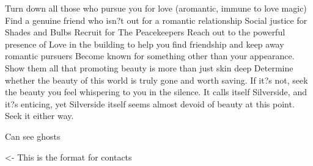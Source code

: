 \documentclass[char]{Silversiders}
\begin{document}
\name{\cBeauty{}}

Turn down all those who pursue you for love (aromantic, immune to love magic)
Find a genuine friend who isn?t out for a romantic relationship
Social justice for Shades and Bulbs
Recruit for The Peacekeepers
Reach out to the powerful presence of Love in the building to help you find friendship and keep away romantic pursuers
Become known for something other than your appearance. Show them all that promoting beauty is more than just skin deep
Determine whether the beauty of this world is truly gone and worth saving. 
If it?s not, seek the beauty you feel whispering to you in the silence. It calls itself Silverside, and it?s enticing, yet Silverside itself seems almost devoid of beauty at this point. Seek it either way.

Can see ghosts

\begin{itemz}[Goals]
	\item 
\end{itemz}

\begin{itemz}[Notes]
	\item 
\end{itemz}

\begin{contacts}
	\contact{\cTest{}} <- This is the format for contacts 
\end{contacts}
\end{document}
